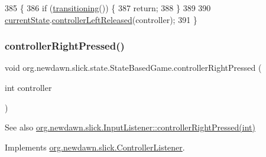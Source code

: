 \begin{DoxyCode}
385                                                        \{
386         \textcolor{keywordflow}{if} (\mbox{\hyperlink{classorg_1_1newdawn_1_1slick_1_1state_1_1_state_based_game_ae869c08778875776081935a090d4c92f}{transitioning}}()) \{
387             \textcolor{keywordflow}{return};
388         \}
389         
390         \mbox{\hyperlink{classorg_1_1newdawn_1_1slick_1_1state_1_1_state_based_game_a6a45e68094bb9b7ec30b8a8b7d415766}{currentState}}.\mbox{\hyperlink{interfaceorg_1_1newdawn_1_1slick_1_1_controller_listener_ad2f898f0efe21771a0d9568c454dea0d}{controllerLeftReleased}}(controller);
391     \}
\end{DoxyCode}
\mbox{\label{classorg_1_1newdawn_1_1slick_1_1state_1_1_state_based_game_a6285a648c82d4f944f1789059c9e27c3}} 
\subsubsection{\texorpdfstring{controller\+Right\+Pressed()}{controllerRightPressed()}}
{\footnotesize\ttfamily void org.\+newdawn.\+slick.\+state.\+State\+Based\+Game.\+controller\+Right\+Pressed (\begin{DoxyParamCaption}\item[{int}]{controller }\end{DoxyParamCaption})\hspace{0.3cm}{\ttfamily [inline]}}

\begin{DoxySeeAlso}{See also}
\mbox{\hyperlink{interfaceorg_1_1newdawn_1_1slick_1_1_controller_listener_ae4ac64996df9778c4987705275792780}{org.\+newdawn.\+slick.\+Input\+Listener\+::controller\+Right\+Pressed(int)}} 
\end{DoxySeeAlso}


Implements \mbox{\hyperlink{interfaceorg_1_1newdawn_1_1slick_1_1_controller_listener_ae4ac64996df9778c4987705275792780}{org.\+newdawn.\+slick.\+Controller\+Listener}}.


